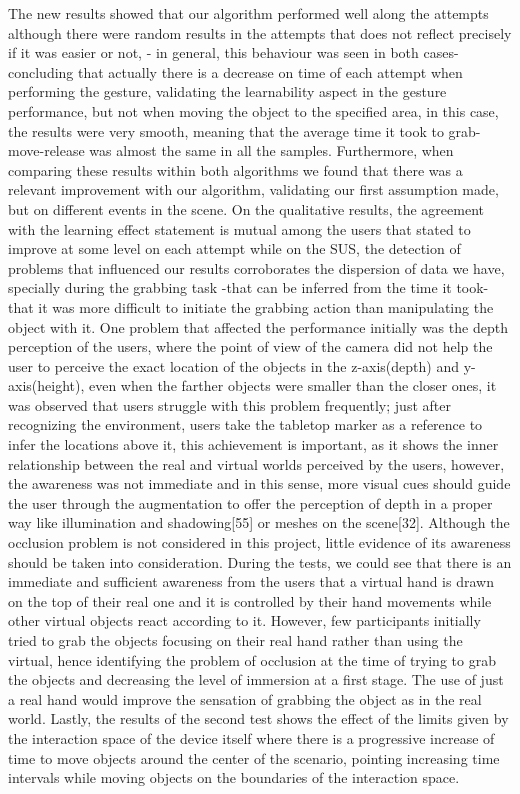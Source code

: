 The new results showed that our algorithm performed well along the attempts although there were random results in the attempts that does not reflect precisely if it was easier or not, - in general, this behaviour was seen in both cases- concluding that actually there is a decrease on time of each attempt when performing the gesture, validating the learnability aspect in the gesture performance, but not when moving the object to the specified area, in this case, the results were very smooth, meaning that the average time it took to grab-move-release was almost the same in all the samples. Furthermore, when comparing these results within both algorithms we found that there was a relevant improvement with our algorithm, validating our first assumption made, but on different events in the scene. On the qualitative results, the agreement with the learning effect statement is mutual among the users that stated to improve at some level on each attempt while on the SUS, the detection of problems that influenced our results corroborates the dispersion of data we have, specially during the grabbing task -that can be inferred from the time it took- that it was more difficult to initiate the grabbing action than manipulating the object with it. One problem that affected the performance initially was the depth perception of the users, where the point of view of the camera did not help the user to perceive the exact location of the objects in the z-axis(depth) and y-axis(height), even when the farther objects were smaller than the closer ones, it was observed that users struggle with this problem frequently; just after recognizing the environment, users take the tabletop marker as a reference to infer the locations above it, this achievement is important, as it shows the inner relationship between the real and virtual worlds perceived by the users, however, the awareness was not immediate and in this sense, more visual cues should guide the user through the augmentation to offer the perception of depth in a proper way like illumination and shadowing[55] or meshes on the scene[32]. Although the occlusion problem is not considered in this project, little evidence of its awareness should be taken into consideration. During the tests, we could see that there is an immediate and sufficient awareness from the users that a virtual hand is drawn on the top of their real one and it is controlled by their hand movements while other virtual objects react according to it. However, few participants initially tried to grab the objects focusing on their real hand rather than using the virtual, hence identifying the problem of occlusion at the time of trying to grab the objects and decreasing the level of immersion at a first stage. The use of just a real hand would improve the sensation of grabbing the object as in the real world. Lastly, the results of the second test shows the effect of the limits given by the interaction space of the device itself where there is a progressive increase of time to move objects around the center of the scenario, pointing increasing time intervals while moving objects on the boundaries of the interaction space.





